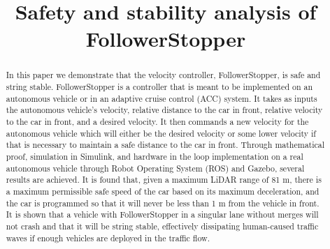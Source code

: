 \documentclass[conference]{IEEEtran}
\begin{document}
\title{Safety and stability analysis of FollowerStopper\\
}

\author{
\and
{}
\and
{}
\and
{}
}

\maketitle

\begin{abstract}
In this paper we demonstrate that the velocity controller, FollowerStopper, is safe and string stable. FollowerStopper is a controller that is meant to be implemented on an autonomous vehicle or in an adaptive cruise control (ACC) system. It takes as inputs the autonomous vehicle's velocity, relative distance to the car in front, relative velocity to the car in front, and a desired velocity.  It then commands a new velocity for the autonomous vehicle which will either be the desired velocity or some lower velocity if that is necessary to maintain a safe distance to the car in front. Through mathematical proof, simulation in Simulink, and hardware in the loop implementation on a real autonomous vehicle through Robot Operating System (ROS) and Gazebo, several results are achieved. It is found that, given a maximum LiDAR range of 81 m, there is a maximum permissible safe speed of the car based on its maximum deceleration, and the car is programmed so that it will never be less than 1 m from the vehicle in front. It is shown that a vehicle with FollowerStopper in a singular lane without merges will not crash and that it will be string stable, effectively dissipating human-caused traffic waves if enough vehicles are deployed in the traffic flow.
\end{abstract}
\end{document}
